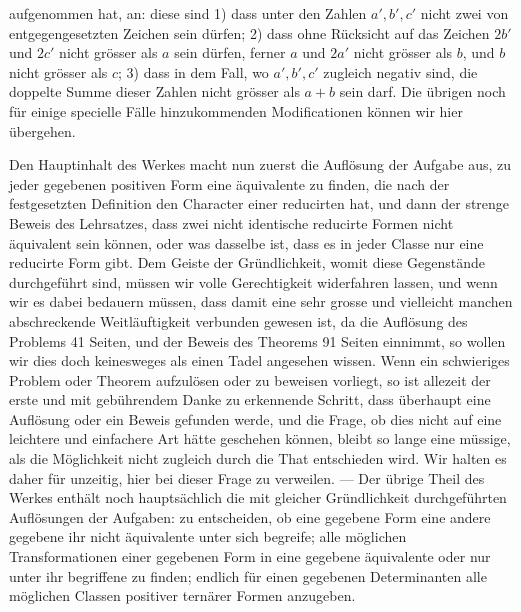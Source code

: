 %
aufgenommen hat, an: diese sind 1) dass unter den Zahlen $a',b',c'$ nicht zwei von entgegengesetzten Zeichen sein dürfen; 2) dass ohne Rücksicht auf das Zeichen $2b'$ und $2c'$ nicht grösser als $a$ sein dürfen, ferner $a$ und $2a'$ nicht grösser als $b$, und $b$ nicht grösser als $c$; 3) dass in dem Fall, wo $a',b',c'$ zugleich negativ sind, die doppelte Summe dieser Zahlen nicht grösser als $a+b$ sein darf. Die übrigen noch für einige specielle Fälle hinzukommenden Modificationen können wir hier übergehen.

Den Hauptinhalt des Werkes macht nun zuerst die Auflösung der Aufgabe aus, zu jeder gegebenen positiven Form eine äquivalente zu finden, die nach der festgesetzten Definition den Character einer reducirten hat, und dann der strenge Beweis des Lehrsatzes, dass zwei nicht identische reducirte Formen nicht äquivalent sein können, oder was dasselbe ist, dass es in jeder Classe nur eine reducirte Form gibt. Dem Geiste der Gründlichkeit, womit diese Gegenstände durchgeführt sind, müssen wir volle Gerechtigkeit widerfahren lassen, und wenn wir es dabei bedauern müssen, dass damit eine sehr grosse und vielleicht manchen abschreckende Weitläuftigkeit verbunden gewesen ist, da die Auflösung des Problems 41 Seiten, und der Beweis des Theorems 91 Seiten einnimmt, so wollen wir dies doch keinesweges als einen Tadel angesehen wissen. Wenn ein schwieriges Problem oder Theorem aufzulösen oder zu beweisen vorliegt, so ist allezeit der erste und mit gebührendem Danke zu erkennende Schritt, dass überhaupt eine Auflösung oder ein Beweis gefunden werde, und die Frage, ob dies nicht auf eine leichtere und einfachere Art hätte geschehen können, bleibt so lange eine müssige, als die Möglichkeit nicht zugleich durch die That entschieden wird. Wir halten es daher für unzeitig, hier bei dieser Frage zu verweilen. --- Der übrige Theil des Werkes enthält noch hauptsächlich die mit gleicher Gründlichkeit durchgeführten Auflösungen der Aufgaben: zu entscheiden, ob eine gegebene Form eine andere gegebene ihr nicht äquivalente unter sich begreife; alle möglichen Transformationen einer gegebenen Form in eine gegebene äquivalente oder nur unter ihr begriffene zu finden; endlich für einen gegebenen Determinanten alle möglichen Classen positiver ternärer Formen anzugeben.

